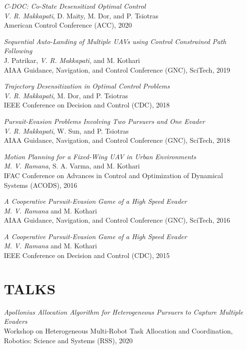 \documentclass[margin, 10pt]{res} %
\begin{document}
\begin{resume}
{\sl C-DOC: Co-State Desensitized Optimal Control}\\
\textit{V. R. Makkapati}, D. Maity, M. Dor, and P. Tsiotras\\
American Control Conference (ACC), 2020

{\sl Sequential Auto-Landing of Multiple UAVs using Control Constrained Path Following} \\
J. Patrikar, \textit{V. R. Makkapati}, and M. Kothari \\
AIAA Guidance, Navigation, and Control Conference (GNC), SciTech, 2019 

{\sl Trajectory Desensitization in Optimal Control Problems} \\
\textit{V. R. Makkapati}, M. Dor, and P. Tsiotras \\
IEEE Conference on Decision and Control (CDC), 2018 

{\sl Pursuit-Evasion Problems Involving Two Pursuers and One Evader} \\ 
\textit{V. R. Makkapati}, W. Sun, and P. Tsiotras \\
AIAA Guidance, Navigation, and Control Conference (GNC), SciTech, 2018

{\sl Motion Planning for a Fixed-Wing UAV in Urban Environments} \\
\textit{M. V. Ramana}, S. A. Varma, and M. Kothari \\
IFAC Conference on Advances in Control and Optimization of Dynamical Systems (ACODS), 2016

{\sl A Cooperative Pursuit-Evasion Game of a High Speed Evader} \\
\textit{M. V. Ramana} and M. Kothari \\
AIAA Guidance, Navigation, and Control Conference (GNC), SciTech, 2016

{\sl A Cooperative Pursuit-Evasion Game of a High Speed Evader} \\
\textit{M. V. Ramana} and M. Kothari \\
IEEE Conference on Decision and Control (CDC), 2015

\section{TALKS}

{\sl Apollonius Allocation Algorithm for Heterogeneous Pursuers to Capture Multiple Evaders} \\
Workshop on Heterogeneous Multi-Robot Task Allocation and Coordination, Robotics: Science and Systems (RSS), 2020


\end{resume}
\end{document}
